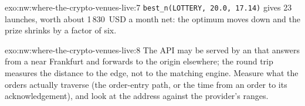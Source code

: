 \begin{solution}{exo:nw:where-the-crypto-venues-live:7}
\texttt{best\_n(LOTTERY, 20.0, 17.14)} gives 23 launches, worth about 1\,830~USD a month net: the optimum moves down and the prize shrinks by a factor of
six.
\end{solution}

\begin{solution}{exo:nw:where-the-crypto-venues-live:8}
The API may be served by an  that answers from a  near Frankfurt and forwards to the origin elsewhere; the round trip
measures the distance to the edge, not to the matching engine. Measure what the orders actually traverse (the order-entry path, or the time from an
order to its acknowledgement), and look at the address against the provider's ranges.
\end{solution}

